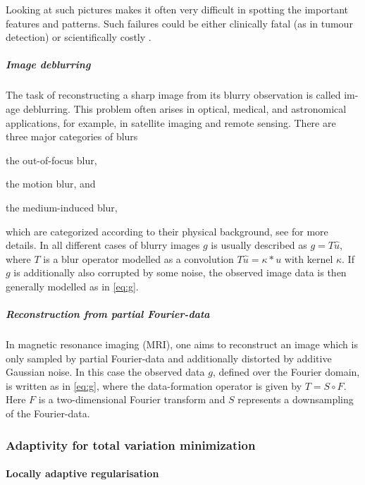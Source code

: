 \documentclass[enabledeprecatedfontcommands,cleardoublepage=empty,headsepline,twoside,11pt,DIV=15,BCOR=12mm,final]{scrartcl}
\begin{document}
Looking at such pictures makes it often very difficult in spotting the important features and patterns. Such failures could be either clinically fatal (as in tumour detection) or scientifically costly \cite{ChaShe}.


\subparagraph{Image deblurring}

The task of reconstructing a sharp image from its blurry observation is called im- age deblurring. This problem often arises in optical, medical, and astronomical applications, for example, in satellite imaging and remote sensing. There are three major categories of blurs \begin{inparaenum}[(i)]
\item the out-of-focus blur,
\item the motion blur, and 
\item the medium-induced blur, 
\end{inparaenum}
which are categorized according to their physical background, see \cite{ChaShe} for more details. In all different cases of blurry images $g$ is usually described as $g =T\hat{u}$, where $T$ is a blur operator modelled as a convolution $T\hat{u} = \kappa * u$ with kernel $\kappa$. If $g$ is additionally also corrupted by some noise, the observed image data is then generally modelled as in \eqref{eq:g}.

\subparagraph{Reconstruction from partial Fourier-data}

In magnetic resonance imaging (MRI), one aims to reconstruct an image which is only sampled by partial Fourier-data and additionally distorted by additive Gaussian noise. In this case the observed data $g$, defined over the Fourier domain, is written as in \eqref{eq:g}, where the data-formation operator is given by $T = S \circ F$. Here $F$ is a two-dimensional Fourier transform and $S$ represents a downsampling of the Fourier-data. 


\subsubsection{Adaptivity for total variation minimization}

\paragraph{Locally adaptive regularisation}
\end{document}
